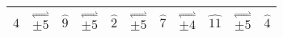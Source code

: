 \documentclass{standalone}
\begin{document}
     \begin{tabular}{||c|c|c|c|c|c|c|c|c|c|c||} 
     \hline
      $\widehat{4}$ &  $\stackrel{\rightleftharpoons}{\pm5}$ & $\widehat{9}$  & $\stackrel{\rightleftharpoons}{\pm5}$ & $\widehat{2}$ & $\stackrel{\rightleftharpoons}{\pm5}$ & $\widehat{7}$ & $\stackrel{\rightleftharpoons}{\pm4}$ & $\widehat{11}$ & $\stackrel{\rightleftharpoons}{\pm5}$ & $\widehat{4}$  \\
     \hline 
  \end{tabular}
\end{document}
